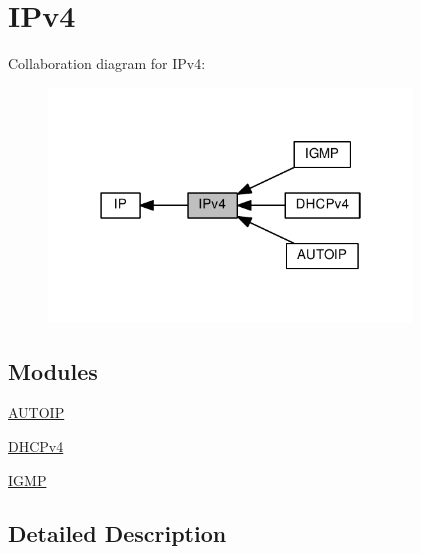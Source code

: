 \hypertarget{group__ip4}{}\section{I\+Pv4}
\label{group__ip4}
Collaboration diagram for I\+Pv4\+:
\nopagebreak
\begin{figure}[H]
\begin{center}
\leavevmode
\includegraphics[width=274pt]{group__ip4}
\end{center}
\end{figure}
\subsection*{Modules}
\begin{DoxyCompactItemize}
\item 
\hyperlink{group__autoip}{A\+U\+T\+O\+IP}
\item 
\hyperlink{group__dhcp4}{D\+H\+C\+Pv4}
\item 
\hyperlink{group__igmp}{I\+G\+MP}
\end{DoxyCompactItemize}


\subsection{Detailed Description}
